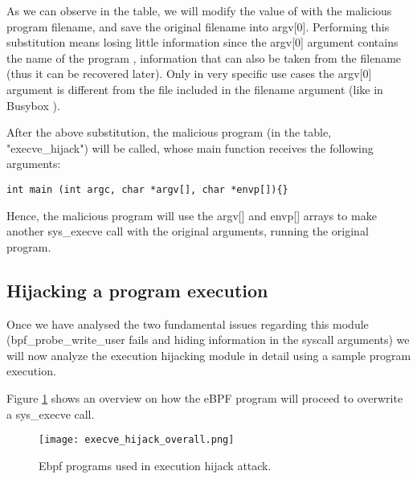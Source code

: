 As we can observe in the table, we will modify the value of  with the malicious program filename, and save the original filename into argv[0]. Performing this substitution means losing little information since the argv[0] argument contains the name of the program \cite{c_standard_main}, information that can also be taken from the filename (thus it can be recovered later). Only in very specific use cases the argv[0] argument is different from the file included in the filename argument (like in Busybox \cite{busybox_argv}). 

After the above substitution, the malicious program (in the table, "execve\_hijack") will be called, whose main function receives the following arguments:

\begin{verbatim}
int main (int argc, char *argv[], char *envp[]){}
\end{verbatim}

Hence, the malicious program will use the argv[] and envp[] arrays to make another sys\_execve call with the original arguments, running the original program. 

\subsection{Hijacking a program execution}
Once we have analysed the two fundamental issues regarding this module (bpf\_probe\_write\_user fails and hiding information in the syscall arguments) we will now analyze the execution hijacking module in detail using a sample program execution.

Figure \ref{fig:execve_hijack_overall} shows an overview on how the eBPF program will proceed to overwrite a sys\_execve call.

\begin{figure}[htbp]
	\centering
	\texttt{[image: execve\_hijack\_overall.png]}
	\caption{Ebpf programs used in execution hijack attack.}
	\label{fig:execve_hijack_overall}
\end{figure}

